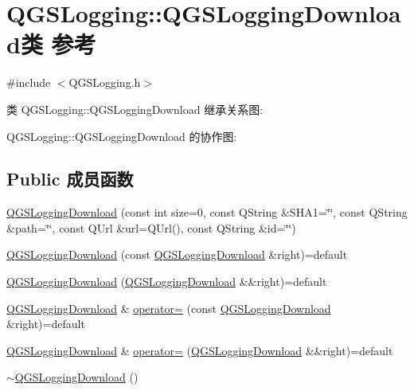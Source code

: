 \hypertarget{class_q_g_s_logging_1_1_q_g_s_logging_download}{}\section{Q\+G\+S\+Logging\+:\+:Q\+G\+S\+Logging\+Download类 参考}
\label{class_q_g_s_logging_1_1_q_g_s_logging_download}


{\ttfamily \#include $<$Q\+G\+S\+Logging.\+h$>$}



类 Q\+G\+S\+Logging\+:\+:Q\+G\+S\+Logging\+Download 继承关系图\+:


Q\+G\+S\+Logging\+:\+:Q\+G\+S\+Logging\+Download 的协作图\+:
\subsection*{Public 成员函数}
\begin{DoxyCompactItemize}
\item 
\mbox{\hyperlink{class_q_g_s_logging_1_1_q_g_s_logging_download_a0828a95ff26d0ef3c66f4077a8509e94}{Q\+G\+S\+Logging\+Download}} (const int size=0, const Q\+String \&S\+H\+A1=\char`\"{}\char`\"{}, const Q\+String \&path=\char`\"{}\char`\"{}, const Q\+Url \&url=Q\+Url(), const Q\+String \&id=\char`\"{}\char`\"{})
\item 
\mbox{\hyperlink{class_q_g_s_logging_1_1_q_g_s_logging_download_a431c38a2fe1dcd4c504f35936e09283d}{Q\+G\+S\+Logging\+Download}} (const \mbox{\hyperlink{class_q_g_s_logging_1_1_q_g_s_logging_download}{Q\+G\+S\+Logging\+Download}} \&right)=default
\item 
\mbox{\hyperlink{class_q_g_s_logging_1_1_q_g_s_logging_download_a237ff1f3466f9d7ac1256744090a9f4c}{Q\+G\+S\+Logging\+Download}} (\mbox{\hyperlink{class_q_g_s_logging_1_1_q_g_s_logging_download}{Q\+G\+S\+Logging\+Download}} \&\&right)=default
\item 
\mbox{\hyperlink{class_q_g_s_logging_1_1_q_g_s_logging_download}{Q\+G\+S\+Logging\+Download}} \& \mbox{\hyperlink{class_q_g_s_logging_1_1_q_g_s_logging_download_ad83da7c2aefb59f97f9eb40d26ce4716}{operator=}} (const \mbox{\hyperlink{class_q_g_s_logging_1_1_q_g_s_logging_download}{Q\+G\+S\+Logging\+Download}} \&right)=default
\item 
\mbox{\hyperlink{class_q_g_s_logging_1_1_q_g_s_logging_download}{Q\+G\+S\+Logging\+Download}} \& \mbox{\hyperlink{class_q_g_s_logging_1_1_q_g_s_logging_download_ad876531605120acd14a39478a9160eb1}{operator=}} (\mbox{\hyperlink{class_q_g_s_logging_1_1_q_g_s_logging_download}{Q\+G\+S\+Logging\+Download}} \&\&right)=default
\item 
\mbox{\hyperlink{class_q_g_s_logging_1_1_q_g_s_logging_download_ab31da60dc3c17acd1106a737f00b3218}{$\sim$\+Q\+G\+S\+Logging\+Download}} ()
\end{DoxyCompactItemize}
